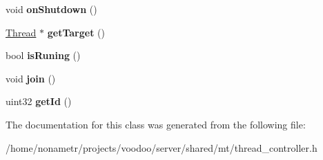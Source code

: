 \begin{DoxyCompactItemize}
\item 
\hypertarget{classThreadController_a3825c8c75845c86c48ea1f4caabfc3f5}{void {\bfseries on\-Shutdown} ()}\label{classThreadController_a3825c8c75845c86c48ea1f4caabfc3f5}

\item 
\hypertarget{classThreadController_a945a302b689835971081b21a57c16023}{\hyperlink{classThread}{\-Thread} $\ast$ {\bfseries get\-Target} ()}\label{classThreadController_a945a302b689835971081b21a57c16023}

\item 
\hypertarget{classThreadController_a6cc4c389d03bb41a87f495dc01291c03}{bool {\bfseries is\-Runing} ()}\label{classThreadController_a6cc4c389d03bb41a87f495dc01291c03}

\item 
\hypertarget{classThreadController_a2dd979e4429cff919c2fd12fa02c1394}{void {\bfseries join} ()}\label{classThreadController_a2dd979e4429cff919c2fd12fa02c1394}

\item 
\hypertarget{classThreadController_adec4078ce648e604e0aad5473e23d0af}{uint32 {\bfseries get\-Id} ()}\label{classThreadController_adec4078ce648e604e0aad5473e23d0af}

\end{DoxyCompactItemize}


\-The documentation for this class was generated from the following file\-:\begin{DoxyCompactItemize}
\item 
/home/nonametr/projects/voodoo/server/shared/mt/thread\-\_\-controller.\-h\end{DoxyCompactItemize}

